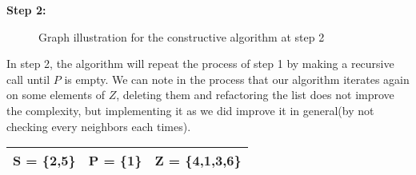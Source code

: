     \vspace{1\baselineskip}

    \begin{minipage}{\linewidth}
        \textbf{Step 2:} \newline
        \begin{minipage}{0.4\textwidth}
            \begin{figure}[H]
                \centering
                \caption{Graph illustration for the constructive algorithm at step 2}
                \label{fig:constructive-mewc-edge-step2}
            \end{figure}
        \end{minipage}
        \begin{minipage}{0.6\textwidth}
            In step 2, the algorithm will repeat the process of step 1 by making a recursive call until $P$ is empty. We can note in the process that our algorithm iterates again on some elements of $Z$, deleting them and refactoring the list does not improve the complexity, but implementing it as we did improve it in general(by not checking every neighbors each times). 
    
            \begin{center}
                \begin{tabular}{|lll|}
                    \hline
                    S = \{2,5\} & P = \{1\} & Z = \{4,1,3,6\} \\
                    \hline
                \end{tabular}
            \end{center}
        \end{minipage}
    \end{minipage}

